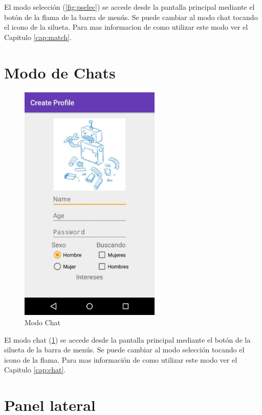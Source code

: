 \documentclass[10pt,letterpaper,extrafontsizes]{memoir}
\begin{document}
El modo selección (\ref{fig:pselec}) se accede desde la pantalla principal mediante el botón de la flama de la barra de menús. Se puede cambiar al modo chat tocando el icono de la silueta. Para mas informacion de como utilizar este modo ver el Capitulo \ref{cap:match}.

\section{Modo de Chats} \label{sec:chat}

\begin{figure}[H]
    \centering
\includegraphics[width=0.6\textwidth]{graficos/capturas/i}
    \caption{Modo Chat}
    \label{fig:pchat}
\end{figure}

El modo chat (\ref{fig:pchat}) se accede desde la pantalla principal mediante el botón de la silueta de la barra de menús. Se puede cambiar al modo selección tocando el icono de la flama. Para mas información de como utilizar este modo ver el Capitulo \ref{cap:chat}.

\section{Panel lateral} \label{sec:lat}
\end{document}
